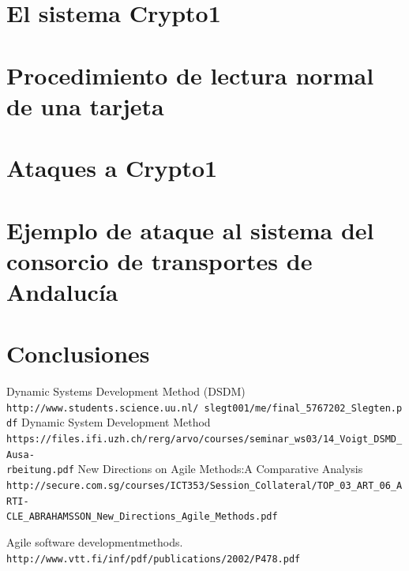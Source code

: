 \documentclass[12pt,a4paper]{article}
\begin{document}
\section{El sistema Crypto1}

\section{Procedimiento de lectura normal de una tarjeta}

\section{Ataques a Crypto1}

\section{Ejemplo de ataque al sistema del consorcio de transportes de Andalucía}

\section{Conclusiones}

\begin{thebibliography}{9}

 Dynamic Systems Development Method (DSDM)
\\\texttt{http://www.students.science.uu.nl/~slegt001/me/final\_5767202\_Slegten.pdf}
Dynamic System Development Method
\\\texttt{https://files.ifi.uzh.ch/rerg/arvo/courses/seminar\_ws03/14\_Voigt\_DSMD\_Ausa-\\rbeitung.pdf}
New Directions on Agile Methods:A Comparative Analysis
\\\texttt{http://secure.com.sg/courses/ICT353/Session\_Collateral/TOP\_03\_ART\_06\_ARTI-\\CLE\_ABRAHAMSSON\_New\_Directions\_Agile\_Methods.pdf}

Agile software developmentmethods.
\\\texttt{http://www.vtt.fi/inf/pdf/publications/2002/P478.pdf}
\end{thebibliography}
\end{document}
